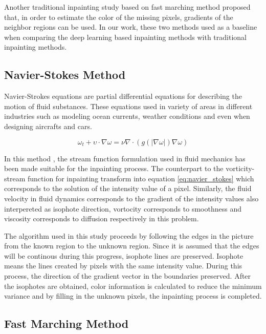 Another traditional inpainting study based on fast marching method \cite{telea} proposed that, in order to estimate the color of the missing pixels, gradients of the neighbor regions can be used. In our work, these two methods used as a baseline when comparing the deep learning based inpainting methods with traditional inpainting methods.

\subsection{Navier-Stokes Method}

Navier-Strokes equations are partial differential equations for describing the motion of fluid substances. These equations used in variety of areas in different industries such as modeling ocean currents, weather conditions and even when designing aircrafts and cars.

\begin{equation}
    \omega_{t} + \upsilon \cdot \nabla \omega = \nu \nabla \cdot \left ( g \left ( \left | \nabla \omega \right | \right ) \nabla \omega \right)
    \label{eq:navier_stokes}
\end{equation}

In this method \cite{navier_stokes}, the stream function formulation used in fluid mechanics has been made suitable for the inpainting process. The counterpart to the vorticity-stream function for inpainting transform into equation \ref{eq:navier_stokes} which corresponds to the solution of the intensity value of a pixel. \cite{navier_stokes_inpainting} Similarly, the fluid velocity in fluid dynamics corresponds to the gradient of the intensity values also interpereted as isophote direction, vortocity corresponds to smoothness and viscosity corresponds to diffusion respectively in this problem.

The algorithm used in this study proceeds by following the edges in the picture from the known region to the unknown region. Since it is assumed that the edges will be continous during this progress, isophote lines are preserved. Isophote means the lines created by pixels with the same intensity value. During this process, the direction of the gradient vector in the boundaries preserved. After the isophotes are obtained, color information is calculated to reduce the minimum variance and by filling in the unknown pixels, the inpainting process is completed.

\subsection{Fast Marching Method}


